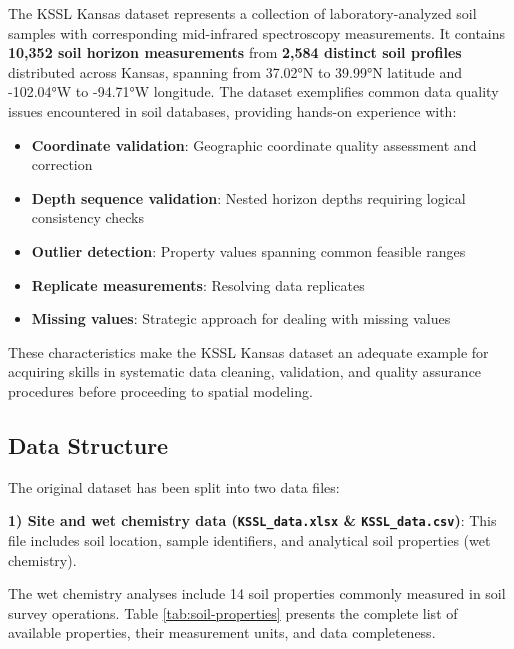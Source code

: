 \documentclass[
  10pt,
  b5paper,
  oneside]{book}
\providecommand{\tightlist}{%
  \setlength{\itemsep}{0pt}\setlength{\parskip}{0pt}}
\begin{document}
The KSSL Kansas dataset represents a collection of laboratory-analyzed soil samples with corresponding mid-infrared spectroscopy measurements. It contains \textbf{10,352 soil horizon measurements} from \textbf{2,584 distinct soil profiles} distributed across Kansas, spanning from 37.02°N to 39.99°N latitude and -102.04°W to -94.71°W longitude. The dataset exemplifies common data quality issues encountered in soil databases, providing hands-on experience with:

\begin{itemize}
\tightlist
\item
  \textbf{Coordinate validation}: Geographic coordinate quality assessment and correction
\item
  \textbf{Depth sequence validation}: Nested horizon depths requiring logical consistency checks
\item
  \textbf{Outlier detection}: Property values spanning common feasible ranges
\item
  \textbf{Replicate measurements}: Resolving data replicates
\item
  \textbf{Missing values}: Strategic approach for dealing with missing values
\end{itemize}

These characteristics make the KSSL Kansas dataset an adequate example for acquiring skills in systematic data cleaning, validation, and quality assurance procedures before proceeding to spatial modeling.

\subsection*{Data Structure}\label{data-structure}

The original dataset has been split into two data files:

\textbf{1) Site and wet chemistry data (\texttt{KSSL\_data.xlsx} \& \texttt{KSSL\_data.csv})}: This file includes soil location, sample identifiers, and analytical soil properties (wet chemistry).

The wet chemistry analyses include 14 soil properties commonly measured in soil survey operations. Table \ref{tab:soil-properties} presents the complete list of available properties, their measurement units, and data completeness.
\end{document}
